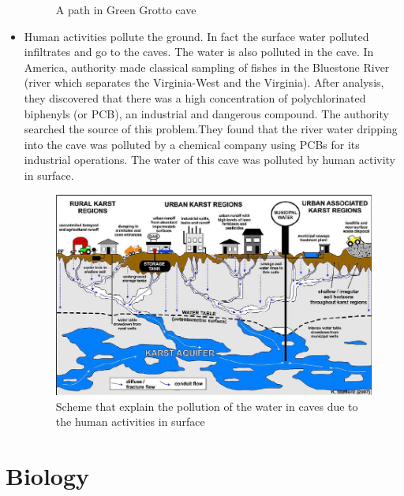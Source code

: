 \documentclass[draft, final]{report}
\begin{document}
\begin{itemize}
\begin{figure}[!ht]
\begin{minipage}[c]{.46\linewidth}
          \caption{A path in Green Grotto cave\cite{pathincaves}}
      \end{minipage}
  \end{figure}
  \clearpage
  \item Human activities pollute the ground. In fact the surface water polluted infiltrates and go to the caves. The water is also polluted in the cave. In America, authority made classical sampling of fishes in the Bluestone River (river which separates the Virginia-West and the Virginia). After analysis, they discovered that there was a high concentration of polychlorinated biphenyls (or PCB), an industrial and dangerous compound. The authority searched the source of this problem.They found that the river water dripping into the cave was polluted by a chemical company using PCBs for its industrial operations. The water of this cave was polluted by human activity in surface.\\
  \newline
  \newline
  \newline
  \newline
  \newline
  \begin{figure}[!ht]
    \centering
    \includegraphics[scale=0.6]{LateX/Images/waterpollutionincaves.png}
    \caption{Scheme that explain the pollution of the water in caves due to the human activities in surface\cite{waterpollution}}
  \end{figure}

\end{itemize}
\newpage
\clearpage
\part{Biology}
\end{document}
